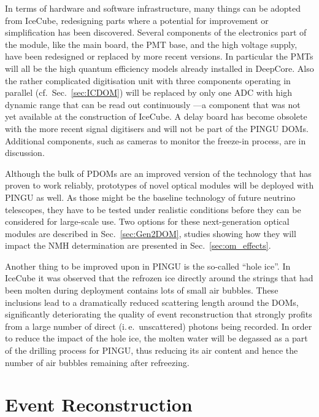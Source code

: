 In terms of hardware and software infrastructure, many things can be adopted 
from IceCube, redesigning parts where a potential for improvement or 
simplification has been discovered. Several components of the electronics part
of the module, like the main board, the PMT base, and the high voltage supply,
have been redesigned or replaced by more recent versions. In particular the PMTs
will all be the high quantum efficiency models already installed in DeepCore.
Also the rather complicated digitisation unit with three components operating
in parallel (cf.~Sec.~\ref{sec:ICDOM}) will be replaced by only one ADC with
high dynamic range that can be read out continuously \cite{PDOM_Aachen}---a
component that was not yet available at the construction of IceCube.
A delay board has become obsolete with the more recent signal digitisers and
will not be part of the PINGU DOMs. Additional components, such as cameras to
monitor the freeze-in process, are in discussion.

Although the bulk of PDOMs are an improved version of the technology that has 
proven to work reliably, prototypes of novel optical modules will be deployed 
with PINGU as well. As those might be the baseline technology of future 
neutrino telescopes, they have to be tested under realistic conditions before 
they can be considered for large-scale use. Two options for these 
next-generation optical modules are described in Sec.~\ref{sec:Gen2DOM}, 
studies showing how they will impact the NMH determination are presented in 
Sec.~\ref{sec:om_effects}.

Another thing to be improved upon in PINGU is the so-called ``hole ice''. In 
IceCube it was observed that the refrozen ice directly around the strings that 
had been molten during deployment contains lots of small air bubbles. These 
inclusions lead to a dramatically reduced scattering length around the DOMs,
significantly deteriorating the quality of event reconstruction that strongly
profits from a large number of direct (i.\,e.\ unscattered) photons being
recorded. In order to reduce the impact of the hole ice, the molten water will
be degassed as a part of the drilling process for PINGU, thus reducing its air
content and hence the number of air bubbles remaining after refreezing.

\section{Event Reconstruction}
\label{sec:EvtReco}

